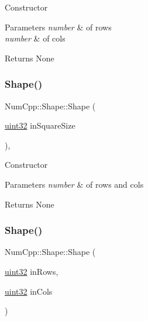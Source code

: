 Constructor


\begin{DoxyParams}{Parameters}
{\em number} & of rows \\
\hline
{\em number} & of cols\\
\hline
\end{DoxyParams}
\begin{DoxyReturn}{Returns}
None 
\end{DoxyReturn}
\mbox{\label{class_num_cpp_1_1_shape_a4d6b5503593f769c34b3e0321247589a}} 
\subsubsection{\texorpdfstring{Shape()}{Shape()}\hspace{0.1cm}{\footnotesize\ttfamily [2/3]}}
{\footnotesize\ttfamily Num\+Cpp\+::\+Shape\+::\+Shape (\begin{DoxyParamCaption}\item[{\mbox{\hyperlink{namespace_num_cpp_a36f388e948380413c63011cab9b7fbd5}{uint32}}}]{in\+Square\+Size }\end{DoxyParamCaption})\hspace{0.3cm}{\ttfamily [inline]}, {\ttfamily [explicit]}}

Constructor


\begin{DoxyParams}{Parameters}
{\em number} & of rows and cols\\
\hline
\end{DoxyParams}
\begin{DoxyReturn}{Returns}
None 
\end{DoxyReturn}
\mbox{\label{class_num_cpp_1_1_shape_affab31438afcdb05bc9bd4c2d594b7ec}} 
\subsubsection{\texorpdfstring{Shape()}{Shape()}\hspace{0.1cm}{\footnotesize\ttfamily [3/3]}}
{\footnotesize\ttfamily Num\+Cpp\+::\+Shape\+::\+Shape (\begin{DoxyParamCaption}\item[{\mbox{\hyperlink{namespace_num_cpp_a36f388e948380413c63011cab9b7fbd5}{uint32}}}]{in\+Rows,  }\item[{\mbox{\hyperlink{namespace_num_cpp_a36f388e948380413c63011cab9b7fbd5}{uint32}}}]{in\+Cols }\end{DoxyParamCaption})\hspace{0.3cm}{\ttfamily [inline]}}

